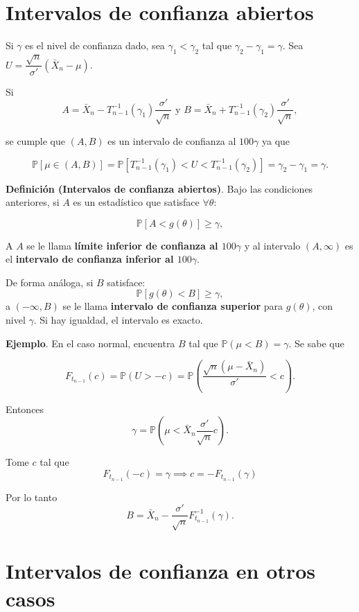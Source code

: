 \documentclass[
  12pt,
]{book}
\begin{document}
\hypertarget{intervalos-de-confianza-abiertos}{%
\section{Intervalos de confianza abiertos}\label{intervalos-de-confianza-abiertos}}

Si \(\gamma\) es el nivel de confianza dado, sea \(\gamma_1<\gamma_2\) tal que \(\gamma_2 -\gamma_1 = \gamma\). Sea \(U = \dfrac{\sqrt n}{\sigma'}(\bar X_n-\mu)\).

Si
\[
A= \bar X_n - T_{n-1}^{-1}(\gamma_1)\dfrac{\sigma'}{\sqrt n} \text{ y } B= \bar X_n +
T_{n-1}^{-1}(\gamma_2)\dfrac{\sigma'}{\sqrt n},
\]

se cumple que \((A,B)\) es un intervalo de confianza al \(100\gamma\) ya que

\[
\mathbb P[\mu \in (A,B)] = \mathbb P[T_{n-1}^{-1}(\gamma_1)<U<T_{n-1}^{-1}(\gamma_2)] =
\gamma_2-\gamma_1 = \gamma.
\]

\textbf{Definición (Intervalos de confianza abiertos)}. Bajo las condiciones
anteriores, si \(A\) es un estadístico que satisface \(\forall \theta\):

\[\mathbb P [A<g(\theta)]\geq \gamma,\]

A \(A\) se le llama \textbf{límite inferior de confianza al \(100\gamma\)} y al intervalo
\((A,\infty)\) es el \textbf{intervalo de confianza inferior al \(100\gamma\)}.

De forma análoga, si \(B\) satisface:
\[\mathbb P [g(\theta)<B]\geq \gamma,\]
a \((-\infty,B)\) se le
llama \textbf{intervalo de confianza superior} para \(g(\theta)\), con nivel \(\gamma\). Si
hay igualdad, el intervalo es exacto.

\textbf{Ejemplo}. En el caso normal, encuentra \(B\) tal que \(\mathbb P(\mu<B) = \gamma\).
Se sabe que

\[F_{t_{n-1}}(c) = \mathbb P(U>-c) = \mathbb P \left(\dfrac{\sqrt n(\mu - \bar
X_n)}{\sigma'}<c\right).\]

Entonces
\[\gamma = \mathbb P\left(\mu < \bar X_n\dfrac{\sigma'}{\sqrt n}c\right).\]

Tome \(c\) tal que
\[F_{t_{n-1}}(-c) = \gamma \implies c = -F_{t_{n-1}}(\gamma)\]

Por lo tanto
\[B = \bar X_n - \dfrac{\sigma'}{\sqrt{n}}F^{-1}_{t_{n-1}}(\gamma).\]

\hypertarget{intervalos-de-confianza-en-otros-casos}{%
\section{Intervalos de confianza en otros casos}\label{intervalos-de-confianza-en-otros-casos}}
\end{document}
